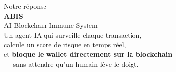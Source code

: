 \documentclass[aspectratio=169,12pt]{beamer}
\begin{document}
{
\begin{frame}[plain]
  \begin{center}
    \vspace{0.5cm}
    {\color{white!50}\small Notre réponse}\\[0.5cm]
    {\color{white}\fontsize{44}{46}\selectfont\bfseries ABIS}\\[0.2cm]
    {\color{white!80}\Large AI Blockchain Immune System}\\[0.8cm]
    {\color{white}\normalsize
    Un agent IA qui surveille chaque transaction,\\
    calcule un score de risque en temps réel,\\
    et \textbf{bloque le wallet directement sur la blockchain}\\
    --- sans attendre qu'un humain lève le doigt.}
  \end{center}
\end{frame}
}
\end{document}
